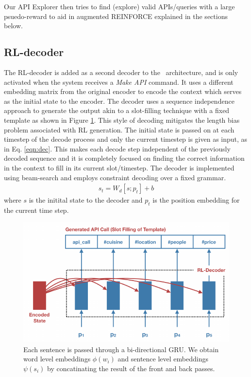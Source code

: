 Our API Explorer then tries to find (explore) valid APIs/queries with a large psuedo-reward to aid in augmented REINFORCE explained in the sections below.

\subsection{RL-decoder}
\label{ssec:rldecode}
The RL-decoder is added as a second decoder to the \sys\ architecture, and is only activated when the system receives a {\em Make API} command. It uses a different embedding matrix from the original encoder to encode the context which serves as the initial state to the encoder. The decoder uses a sequence independence approach to generate the output akin to a slot-filling technique with a fixed template as shown in Figure \ref{fig:rldec}. This style of decoding mitigates the length bias problem associated with RL generation. The initial state is passed on at each timestep of the decode process and only the current timestep is given as input, as in Eq. \ref{eqn:dec}. This makes each decode step independent of the previously decoded sequence and it is completely focused on finding the correct information in the context to fill in its current slot/timestep. The decoder is implemented using beam-search and employs constraint decoding over a fixed grammar.
\begin{eqnarray}
s_{t} = W_d [s;p_t] + b \label{eqn:dec}
\end{eqnarray}
where $s$ is the initital state to the decoder and $p_t$ is the position embedding for the current time step.

\begin{figure}[!t]
\centering
\includegraphics[scale=1.1]{assets/figures/rl_decoder.pdf}
\caption{Each sentence is passed through a bi-directional GRU. We obtain word level embeddings $\phi(w_i)$ and sentence level embeddings $\psi(s_i)$ by concatinating the result of the front and back passes.}
\label{fig:rldec}
\end{figure}

